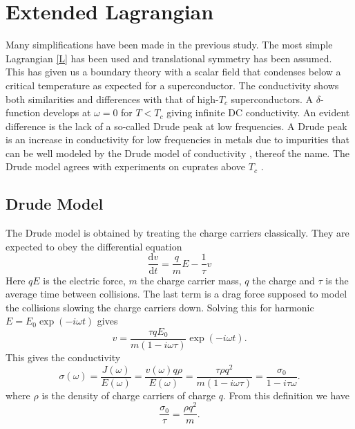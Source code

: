 \documentclass[12pt]{report}
\renewcommand{\d}{\ensuremath{\mathrm{d}}}
\renewcommand{\i}{\ensuremath{i}}
\begin{document}
\chapter{Extended Lagrangian\label{higherOrder}}
Many simplifications have been made in the previous study. The most simple Lagrangian \eqref{L} has been used and translational symmetry has been assumed. This has given us a boundary theory with a scalar field that condenses below a critical temperature as expected for a superconductor. The conductivity shows both similarities and differences with that of high-$T_c$ superconductors. A $\delta$-function develops at $\omega=0$ for $T<T_c$ giving infinite DC conductivity. An evident difference is the lack of a so-called Drude peak at low frequencies. A Drude peak is an increase in conductivity for low frequencies in metals due to impurities that can be well modeled by the Drude model of conductivity \cite{drude}, thereof the name. The Drude model agrees with experiments on cuprates above $T_c$ \cite{drudeFit}.

\section{Drude Model}
The Drude model is obtained by treating the charge carriers classically. They are expected to obey the differential equation
\begin{equation}
 \frac{\d v}{\d t}=\frac{q}{m}E-\frac{1}{\tau}v
\end{equation}
Here $qE$ is the electric force, $m$ the charge carrier mass, $q$ the charge and $\tau$ is the average time between collisions. The last term is a drag force supposed to model the collisions slowing the charge carriers down. Solving this for harmonic $E=E_0\exp(-\i\omega t)$ gives 
\begin{equation}
 v=\frac{\tau qE_0}{m(1-\i\omega\tau)}\exp(-\i\omega t).
\end{equation}
This gives the conductivity
\begin{equation}
 \sigma(\omega)=\frac{J(\omega)}{E(\omega)}=\frac{v(\omega)q\rho}{E(\omega)}=\frac{\tau\rho q^2}{m(1-\i\omega\tau)}=\frac{\sigma_0}{1-\i\tau\omega}.
\end{equation}
where $\rho$ is the density of charge carriers of charge $q$. From this definition we have
\begin{equation}
 \frac{\sigma_0}{\tau}=\frac{\rho q^2}{m}.
\end{equation}
\end{document}
